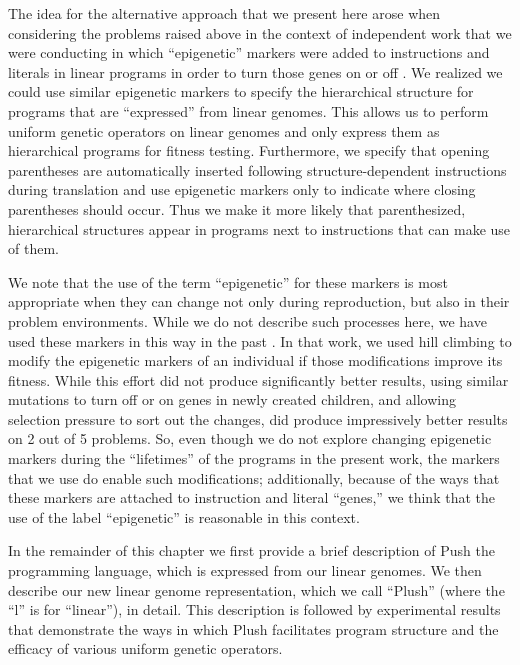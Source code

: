 \documentclass[graybox]{svmult}
\begin{document}
The idea for the alternative approach that we present here arose when considering the problems raised above in the context of independent work that we were conducting in which ``epigenetic'' markers were added to instructions and literals in linear programs in order to turn those genes on or off \cite{LaCava:2014:GPTP, LaCava:2014:GECCOcomp, LaCava:2015:GECCO}.
We realized we could use similar epigenetic markers to specify the hierarchical structure for programs that are ``expressed'' from linear genomes. This allows us to perform uniform genetic operators on linear genomes and only express them as hierarchical programs for fitness testing.
Furthermore, we specify that opening parentheses are automatically inserted following structure-dependent instructions during translation and use epigenetic markers only to indicate where closing parentheses should occur. Thus we make it more likely that parenthesized, hierarchical structures appear in programs next to instructions that can make use of them.

We note that the use of the term ``epigenetic'' for these markers is most appropriate when they can change not only during reproduction, but also in their problem environments. While we do not describe such processes here, we have used these markers in this way in the past \cite{LaCava:2015:GECCO}. In that work, we used hill climbing to modify the epigenetic markers of an individual if those modifications improve its fitness. While this effort did not produce significantly better results, using similar mutations to turn off or on genes in newly created children, and allowing selection pressure to sort out the changes, did produce impressively better results on 2 out of 5 problems. So, even though we do not explore changing epigenetic markers during the ``lifetimes'' of the programs in the present work, the markers that we use do enable such modifications; additionally, because of the ways that these markers are attached to instruction and literal ``genes,'' we think that the use of the label ``epigenetic'' is reasonable in this context.

In the remainder of this chapter we first provide a brief description of Push the programming language, which is expressed from our linear genomes. We then describe our new linear genome representation, which we call ``Plush'' (where the ``l'' is for ``linear''), in detail. This description is followed by experimental results that demonstrate the ways in which Plush facilitates program structure and the efficacy of various uniform genetic operators.
\end{document}
